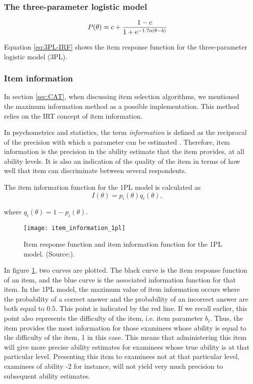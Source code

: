 \subsubsection{The three-parameter logistic model}
\begin{equation} \label{eq:3PL-IRF}
P(\theta) = c + \frac{1 - c}{1 + \mathrm{e}^{-1.7a(\theta - b)}}
\end{equation}

Equation \eqref{eq:3PL-IRF} shows the item response function for the three-parameter logistic model (3PL).

\subsubsection{Item information}
In section \ref{sec:CAT}, when discussing item selection algorithms, we mentioned the maximum information method as a possible implementation. This method relies on the IRT concept of item information.\newline

In psychometrics and statistics, the term \textit{information} is defined as the reciprocal of the precision with which a parameter can be estimated \cite{Basics-IRT}. Therefore, item information is the precision in the ability estimate that the item provides, at all ability levels. It is also an indication of the quality of the item in terms of how well that item can discriminate between several respondents. \newline

The item information function for the 1PL model is calculated as
$$I(\theta) = p_i(\theta)q_i(\theta),$$

where $q_i(\theta) = 1-p_i(\theta)$.

\begin{figure}[H]
\centering
\texttt{[image: item\_information\_1pl]}
\caption{Item response function and item information
function for the 1PL model. (Source:\cite{Visual-IRT}).}
\label{fig:item_information_1pl}
\end{figure}

In figure \ref{fig:item_information_1pl}, two curves are plotted. The black curve is the item response function of an item, and the blue curve is the associated information function for that item. In the 1PL model, the maximum value of item information occurs where the probability of a correct answer and the probability of an incorrect answer are both equal to $0.5$. This point is indicated by the red line. If we recall earlier, this point also represents the difficulty of the item, i.e. item parameter $b_i$. Thus, the item provides the most information for those examinees whose ability is equal to the difficulty of the item, 1 in this case. This means that administering this item will give more precise ability estimates for examinees whose true ability is at that particular level. Presenting this item to examinees not at that particular level, examinees of ability -2 for instance, will not yield very much precision to subsequent ability estimates. \newline

